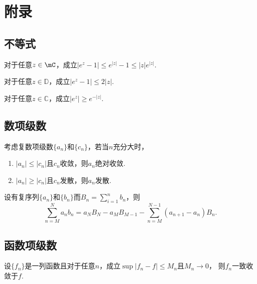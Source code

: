 

\newpage
\section{附录}

\subsection{不等式}

  \begin{pos}
    对于任意$z\in\mC$，成立$|e^z-1|\le e^{|z|}-1\le |z|e^{|z|}$.
  \end{pos}

  \begin{pos}
    对于任意$z\in\mathbb{D}$，成立$|e^z-1|\le 2|z|$.
  \end{pos}

  \begin{pos}
    对于任意$z\in\mathbb{C}$，成立$|e^z|\ge e^{-|z|}$.
  \end{pos}


\subsection{数项级数}

  \begin{thm}
    考虑复数项级数$\{a_n\}$和$\{c_n\}$，若当$n$充分大时，
    \begin{enumerate}
      \item $|a_n| \le |c_n|$且$c_n$收敛，则$a_n$绝对收敛.
      \item $|a_n| \ge |c_n|$且$c_n$发散，则$a_n$发散.
    \end{enumerate}
  \end{thm}

  \begin{thm}[分部求和]
    \label{thm: 分部求和}
    设有复序列$\{a_n\}$和$\{b_n\}$而$B_n=\sum_{i=1}^nb_n$，则
    \[
      \sum_{n=M}^N a_nb_n = a_NB_N - a_MB_{M-1} -
      \sum_{n=M}^{N-1}(a_{n+1}-a_n)B_n.
    \]
  \end{thm}

\subsection{函数项级数}

  \begin{thm}
    设$\{f_n\}$是一列函数且对于任意$n$，成立$\sup|f_n-f|\le M_n$且$M_n\to 0$，
    则$f_n$一致收敛于$f$.
  \end{thm}

